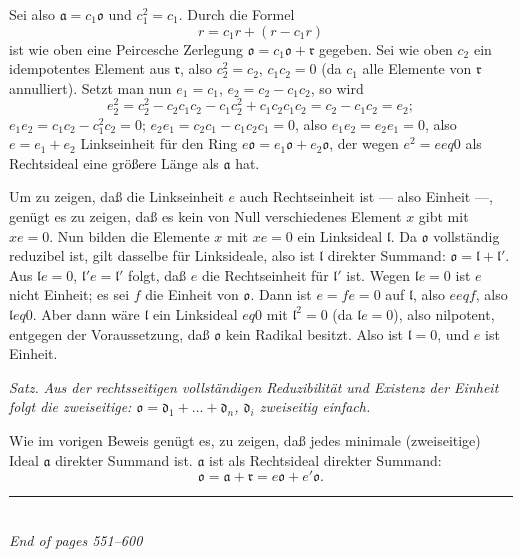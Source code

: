 \documentclass[12pt,a4paper]{article}
\newcommand{\ideala}{\mathfrak{a}}
\theoremstyle{definition}
\begin{document}
Sei also $\mathfrak{a} = c_1\mathfrak{o}$ und $c_1^2 = c_1$. Durch die
Formel
\[
r = c_1r + (r - c_1r)
\]
ist wie oben eine Peircesche Zerlegung $\mathfrak{o} = c_1\mathfrak{o} +
\mathfrak{r}$ gegeben. Sei wie oben $c_2$ ein idempotentes Element aus
$\mathfrak{r}$, also $c_2^2 = c_2$, $c_1c_2 = 0$ (da $c_1$ alle
Elemente von $\mathfrak{r}$ annulliert). Setzt man nun $e_1 = c_1$,
$e_2 = c_2 - c_1c_2$, so wird
\[
e_2^2 = c_2^2 - c_2c_1c_2 - c_1c_2^2 + c_1c_2c_1c_2 = c_2 - c_1c_2 = e_2;
\]
$e_1e_2 = c_1c_2 - c_1^2c_2 = 0$; $e_2e_1 = c_2c_1 - c_1c_2c_1 = 0$,
also $e_1e_2 = e_2e_1 = 0$, also $e = e_1 + e_2$ Linkseinheit f\"ur
den Ring $e\mathfrak{o} = e_1\mathfrak{o} + e_2\mathfrak{o}$, der wegen
$e^2 = e  eq 0$ als Rechtsideal eine gr\"o\ss ere L\"ange als
$\mathfrak{a}$ hat.

Um zu zeigen, da\ss{} die Linkseinheit $e$ auch Rechtseinheit ist --- also
Einheit ---, gen\"ugt es zu zeigen, da\ss{} es kein von Null verschiedenes
Element $x$ gibt mit $xe = 0$. Nun bilden die Elemente $x$ mit $xe = 0$
ein Linksideal $\mathfrak{l}$. Da $\mathfrak{o}$ vollst\"andig reduzibel
ist, gilt dasselbe f\"ur Linksideale, also ist $\mathfrak{l}$ direkter
Summand: $\mathfrak{o} = \mathfrak{l} + \mathfrak{l}'$. Aus
$\mathfrak{l}e = 0$, $\mathfrak{l}'e = \mathfrak{l}'$ folgt, da\ss{} $e$
die Rechtseinheit f\"ur $\mathfrak{l}'$ ist. Wegen $\mathfrak{l}e = 0$ ist
$e$ nicht Einheit; es sei $f$ die Einheit von $\mathfrak{o}$. Dann ist
$e = fe = 0$ auf $\mathfrak{l}$, also $e  eq f$, also $\mathfrak{l}
 eq 0$. Aber dann w\"are $\mathfrak{l}$ ein Linksideal $ eq 0$ mit
$\mathfrak{l}^2 = 0$ (da $\mathfrak{l}e = 0$), also nilpotent,
entgegen der Voraussetzung, da\ss{} $\mathfrak{o}$ kein Radikal besitzt.
Also ist $\mathfrak{l} = 0$, und $e$ ist Einheit.

\medskip

\textit{Satz.} \textit{Aus der rechtsseitigen vollst\"andigen Reduzibilit\"at
und Existenz der Einheit folgt die zweiseitige:
$\mathfrak{o} = \mathfrak{d}_1 + \dots + \mathfrak{d}_n$, $\mathfrak{d}_i$
zweiseitig einfach.}

Wie im vorigen Beweis gen\"ugt es, zu zeigen, da\ss{} jedes minimale
(zweiseitige) Ideal $\ideala$ direkter Summand ist. $\ideala$ ist als
Rechtsideal direkter Summand:
\[
\mathfrak{o} = \ideala + \mathfrak{r} = e\mathfrak{o} + e'\mathfrak{o}.
\]


\vfill
\begin{center}
\rule{0.5\textwidth}{0.4pt}\\[0.5em]
\textit{End of pages 551--600}
\end{center}
\end{document}
